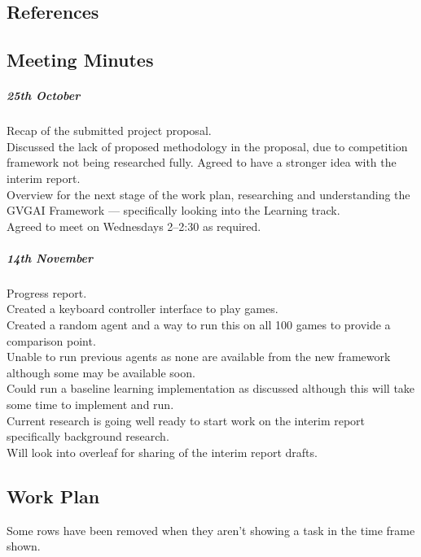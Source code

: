 \documentclass[a4paper]{article}
\begin{document}
\subsection{References}
\renewcommand\refname{\vspace{-1cm}}



\subsection{Meeting Minutes}
\subparagraph{25th October}
Recap of the submitted project proposal. \\
Discussed the lack of proposed methodology in the proposal, due to competition framework not being researched fully. Agreed to have a stronger idea with the interim report. \\
Overview for the next stage of the work plan, researching and understanding the GVGAI Framework --- specifically looking into the Learning track. \\
Agreed to meet on Wednesdays 2--2:30 as required.

\subparagraph{14th November}
Progress report. \\
Created a keyboard controller interface to play games. \\
Created a random agent and a way to run this on all 100 games to provide a comparison point. \\
Unable to run previous agents as none are available from the new framework although some may be available soon. \\
Could run a baseline learning implementation as discussed although this will take some time to implement and run. \\
Current research is going well ready to start work on the interim report specifically background research. \\
Will look into overleaf for sharing of the interim report drafts.

\subsection{Work Plan}
Some rows have been removed when they aren't showing a task in the time frame shown.
\end{document}
